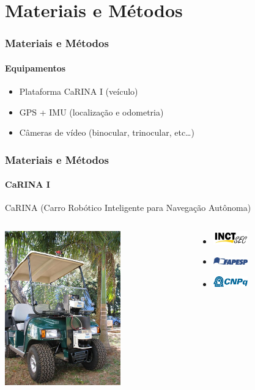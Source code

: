 \documentclass[brazil]{beamer}
\begin{document}
\section{Materiais e Métodos}


\begin{frame}
\frametitle{Materiais e Métodos}
\framesubtitle{Equipamentos}
\begin{itemize}
\item Plataforma CaRINA I (veículo)
\item GPS + IMU (localização e odometria)
\item Câmeras de vídeo (binocular, trinocular, etc\ldots)
\end{itemize}
\end{frame}


\begin{frame}
\frametitle{Materiais e Métodos}
\framesubtitle{CaRINA I}
 CaRINA (Carro Robótico Inteligente para Navegação Autônoma)
\begin{columns}[c]
\begin{column}{5cm}
\includegraphics[width=5cm,keepaspectratio]{carina1_1.jpg}
\end{column}
\begin{column}{5cm}
\begin{itemize}
\item \includegraphics[width=1.5cm,keepaspectratio]{inct.jpg}
\item \includegraphics[width=1.5cm,keepaspectratio]{fapesp.jpg}
\item \includegraphics[width=1.5cm,keepaspectratio]{cnpq.png}
\end{itemize}
\end{column}
\end{columns}
\end{frame}
\end{document}

